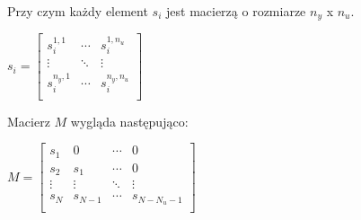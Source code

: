 Przy czym każdy element $s_i$ jest macierzą o rozmiarze $n_y$ x $n_u$.

\begin{math}
    s_i = \begin{bmatrix}
        s_i^{1,1} & \cdots & s_i^{1,n_u} \\
        \vdots & \ddots & \vdots \\
        s_i^{n_y,1} & \cdots & s_i^{n_y,n_u} \\
    \end{bmatrix}
\end{math}

Macierz $M$ wygląda następująco:

\begin{math}
    M = \begin{bmatrix}
        s_1 & 0 & \cdots & 0 \\
        s_2 & s_1 & \cdots & 0 \\
        \vdots & \vdots & \ddots & \vdots \\
        s_N & s_{N - 1} & \cdots & s_{N - N_u - 1} \\
    \end{bmatrix}
\end{math}
